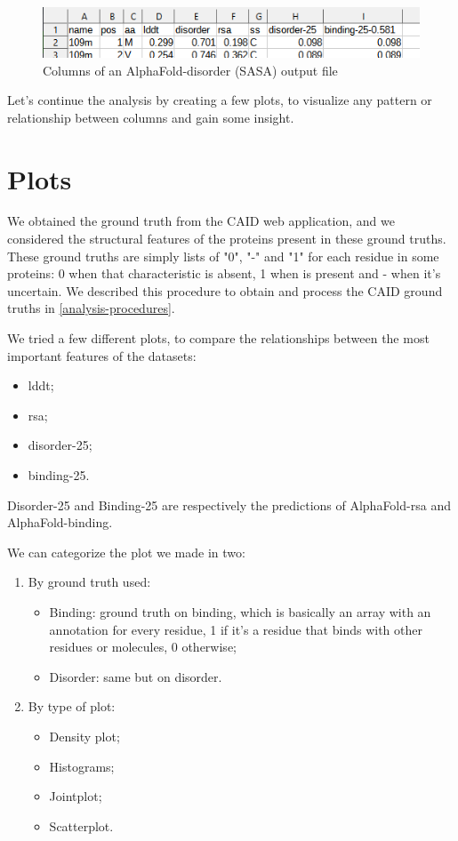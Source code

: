 \begin{figure}
    \centering
    \includegraphics{res/analysis/output_columns.png}
    \caption{Columns of an AlphaFold-disorder (SASA) output file}
\end{figure}

Let's continue the analysis by creating a few plots, to visualize any pattern or relationship between columns and gain some insight.

\section{Plots}
We obtained the ground truth from the CAID web application, and we considered the structural features of the proteins present in these ground truths. These ground truths are simply lists of "0", "-" and "1" for each residue in some proteins: 0 when that characteristic is absent, 1 when is present and - when it's uncertain. We described this procedure to obtain and process the CAID ground truths in \ref{analysis-procedures}.

We tried a few different plots, to compare the relationships between the most important features of the datasets: 

\begin{itemize}
    \item lddt;
    \item rsa;
    \item disorder-25;
    \item binding-25.
\end{itemize}

Disorder-25 and Binding-25 are respectively the predictions of AlphaFold-rsa and AlphaFold-binding.

We can categorize the plot we made in two:

\begin{enumerate}
    \item By ground truth used:
        \begin{itemize}
            \item Binding: ground truth on binding, which is basically an array with an annotation for every residue, 1 if it's a residue that binds with other residues or molecules, 0 otherwise;
            \item Disorder: same but on disorder.
        \end{itemize}
    \item By type of plot:
        \begin{itemize}
            \item Density plot;
            \item Histograms;
            \item Jointplot;
            \item Scatterplot.
        \end{itemize}
\end{enumerate}

